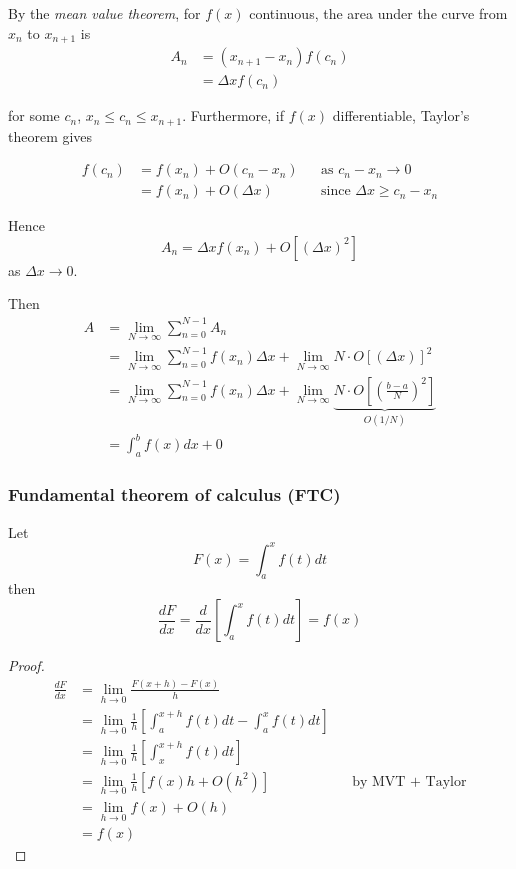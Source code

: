 \documentclass{../template/note}
\begin{document}
    

    By the \emph{mean value theorem}, for \(f(x)\) continuous, the area under the curve from \(x_n\) to \(x_{n+1}\) is
    \begin{align*}
        A_n &= (x_{n+1}-x_n)f(c_n) \\
        &= \Delta x f(c_n)
    \end{align*}
    
    for some \(c_n\), \(x_n \leq c_n \leq x_{n+1}\). Furthermore, if \(f(x)\) differentiable, Taylor's theorem gives

    \begin{align*}
        f(c_n) &= f(x_n) + O(c_n-x_n) && \text{as } c_n - x_n \to 0 \\
        &= f(x_n) + O(\Delta x) && \text{since } \Delta x \geq c_n - x_n
    \end{align*}
    
    Hence
    \[
        A_n = \Delta x f(x_n) + O[(\Delta x)^2]
    \]
    as \(\Delta x \to 0\).
    
    Then
    \begin{align*}
        A &= \lim_{N \to \infty} \sum_{n=0}^{N-1} A_n \\
        &= \lim_{N \to \infty} \sum_{n=0}^{N-1} f(x_n) \Delta x + \lim_{N \to \infty} N \cdot O[(\Delta x)]^2 \\
        &= \lim_{N \to \infty} \sum_{n=0}^{N-1} f(x_n) \Delta x + \lim_{N \to \infty}  \underbrace{N \cdot O\left[\left(\frac{b-a}{N}\right)^2\right]}_{O(1/N)} \\
        &= \int_a^b f(x) dx + 0
    \end{align*}
    
    \subsubsection{Fundamental theorem of calculus (FTC)}
    
    \begin{theorem}[FTC]
        Let
        \[
            F(x) = \int_a^x f(t) dt
        \]
        then
        \[
            \frac{dF}{dx} = \frac{d}{dx} \left[\int_a^x f(t) dt\right] = f(x)
        \]
    \end{theorem}

    \begin{proof}
        \begin{align*}
            \frac{dF}{dx} &= \lim_{h \to 0} \frac {F(x+h)-F(x)} h \\
            &= \lim_{h \to 0} \frac 1 h \left[\int_a^{x+h} f(t) dt-\int_a^x f(t) dt\right] \\
            &= \lim_{h \to 0} \frac 1 h \left[\int_x^{x+h} f(t) dt\right] \\
            &= \lim_{h \to 0} \frac 1 h \left[f(x)h + O(h^2)\right] && \text{by MVT + Taylor} \\
            &= \lim_{h \to 0} f(x) + O(h) \\
            &= f(x)
        \end{align*}
    \end{proof}
    
\end{document}
